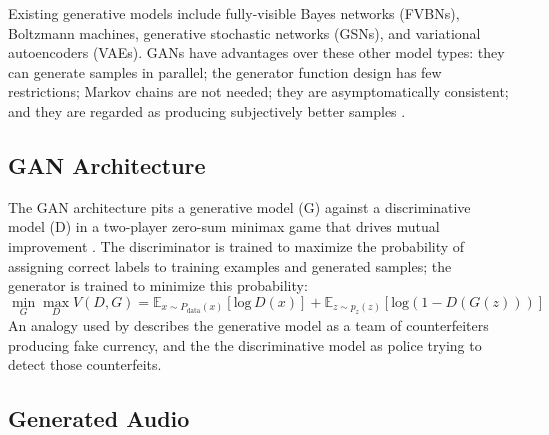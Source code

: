 \documentclass[a4paper, dvipsnames, titlepage]{article}
\begin{document}
Existing generative models include fully-visible Bayes networks (FVBNs), Boltzmann machines, generative stochastic networks (GSNs), and variational autoencoders (VAEs).
GANs have advantages over these other model types: they can generate samples in parallel; the generator function design has few restrictions; Markov chains are not needed; they are asymptomatically consistent; and they are regarded as producing subjectively better samples \citep{2017arXiv170100160G}.

\subsection{GAN Architecture}

The GAN architecture pits a generative model (G) against a discriminative model (D) in a two-player zero-sum minimax game that drives mutual improvement \citep{2014arXiv1406.2661G}.
The discriminator is trained to maximize the probability of assigning correct labels to training examples and generated samples; the generator is trained to minimize this probability:
\newline
%
\begin{equation}
  \min_{G} \max_{D} V(D,G) = \mathbb{E}_{x \sim P_\mathrm{data}(x)}[\mathrm{log}\,D(x)] + \mathbb{E}_{z \sim p_z(z)}[\mathrm{log} (1 - D(G(z)))]
\end{equation}
%
\newline
An analogy used by \citeauthor{2014arXiv1406.2661G} describes the generative model as a team of counterfeiters producing fake currency, and the the discriminative model as police trying to detect those counterfeits.

\subsection{Generated Audio}
\end{document}
